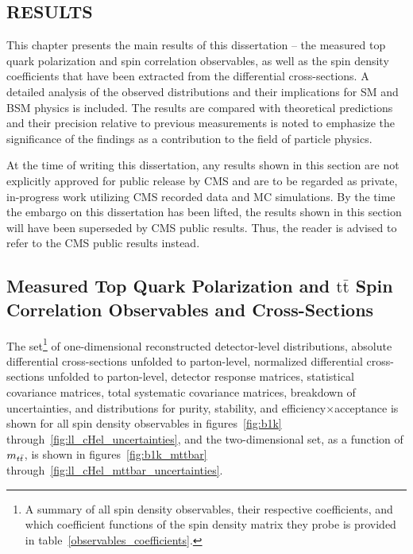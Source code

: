 \begin{refsection}

\chapter{RESULTS}
\label{Results}

\begin{cabstract}
This chapter presents the main results of this dissertation -- the measured top quark polarization and spin correlation observables, as well as the spin density coefficients  that have been extracted from the differential cross-sections.
A detailed analysis of the observed distributions and their implications for SM and BSM physics is included. 
The results are compared with theoretical predictions and their precision relative to previous measurements is noted to emphasize the significance of the findings as a contribution to the field of particle physics.
\end{cabstract}

At the time of writing this dissertation, any results shown in this section are not explicitly approved for public release by CMS and are to be regarded as private, in-progress work utilizing CMS recorded data and MC simulations.
By the time the embargo on this dissertation has been lifted, the results shown in this section will have been superseded by CMS public results.
Thus, the reader is advised to refer to the CMS public results instead.

\section{Measured Top Quark Polarization and \ensuremath{\mathrm{t\bar{t}}} Spin Correlation Observables and Cross-Sections}
The set\footnote{A summary of all spin density observables, their respective coefficients, and which coefficient functions of the spin density matrix they probe is provided in table~\ref{observables_coefficients}.} of one-dimensional reconstructed detector-level distributions, absolute differential cross-sections unfolded to parton-level, normalized differential cross-sections unfolded to parton-level, detector response matrices, statistical covariance matrices, total systematic covariance matrices, breakdown of uncertainties, and distributions for purity, stability, and efficiency$\times$acceptance is shown for all spin density observables in figures~\ref{fig:b1k} through~\ref{fig:ll_cHel_uncertainties}, and the two-dimensional set, as a function of $m_{t\bar{t}}$, is shown in figures~\ref{fig:b1k_mttbar} through~\ref{fig:ll_cHel_mttbar_uncertainties}.


\end{refsection}
